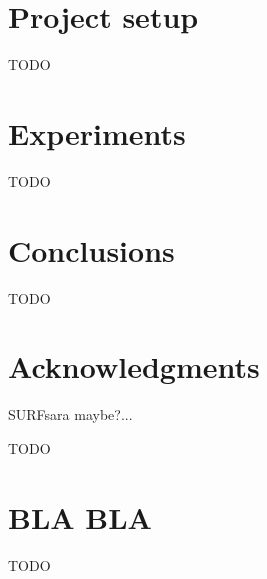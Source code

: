 \documentclass{vldb}
\begin{document}
\section{Project setup}
TODO

\section{Experiments}
TODO

\section{Conclusions}
TODO


\section{Acknowledgments}
SURFsara maybe?...

\clearpage
\balance

 

\begin{appendix}
TODO

\section{BLA BLA}
TODO

\end{appendix}
\end{document}
